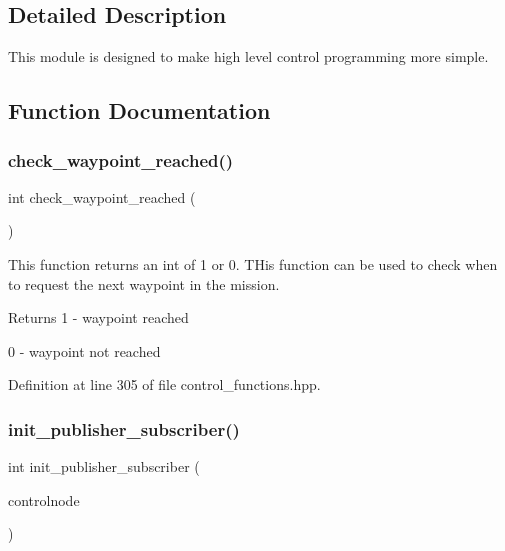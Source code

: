 \subsection{Detailed Description}
This module is designed to make high level control programming more simple. 

\subsection{Function Documentation}
\mbox{\label{group__control__functions_ga54abc3f6eae022a8710bc0c2e1c54fbe}} 
\subsubsection{\texorpdfstring{check\_waypoint\_reached()}{check\_waypoint\_reached()}}
{\footnotesize\ttfamily int check\+\_\+waypoint\+\_\+reached (\begin{DoxyParamCaption}{ }\end{DoxyParamCaption})}

This function returns an int of 1 or 0. T\+His function can be used to check when to request the next waypoint in the mission. \begin{DoxyReturn}{Returns}
1 -\/ waypoint reached 

0 -\/ waypoint not reached 
\end{DoxyReturn}


Definition at line 305 of file control\+\_\+functions.\+hpp.

\mbox{\label{group__control__functions_gae693b071b5392f9253cdfc1f4f362fcc}} 
\subsubsection{\texorpdfstring{init\_publisher\_subscriber()}{init\_publisher\_subscriber()}}
{\footnotesize\ttfamily int init\+\_\+publisher\+\_\+subscriber (\begin{DoxyParamCaption}\item[{ros\+::\+Node\+Handle}]{controlnode }\end{DoxyParamCaption})}

